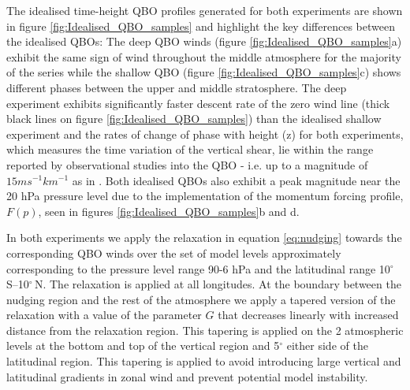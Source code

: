 The idealised time-height QBO profiles generated for both experiments are shown in figure \ref{fig:Idealised_QBO_samples} and highlight the key differences between the idealised QBOs: The deep QBO winds (figure \ref{fig:Idealised_QBO_samples}a) exhibit the same sign of wind throughout the middle atmosphere for the majority of the series while the shallow QBO (figure \ref{fig:Idealised_QBO_samples}c) shows different phases between the upper and middle stratosphere. The deep experiment exhibits significantly faster descent rate of the zero wind line (thick black lines on figure \ref{fig:Idealised_QBO_samples}) than the idealised shallow experiment and the rates of change of phase with height (z) for both experiments, which measures the time variation of the vertical shear, lie within the range reported by observational studies into the QBO - i.e. up to a magnitude of $15ms^{-1}km^{-1}$ as in \cite{kinnersleyDescent1996}. Both idealised QBOs also exhibit a peak magnitude near the 20 hPa pressure level due to the implementation of the momentum forcing profile, $F(p)$, seen in figures \ref{fig:Idealised_QBO_samples}b and d. 

In both experiments we apply the relaxation in equation \ref{eq:nudging} towards the corresponding QBO winds over the set of model levels approximately corresponding to the pressure level range 90-6 hPa and the latitudinal range 10$^{\circ}$\,S--10$^{\circ}$\,N. The relaxation is applied at all longitudes. At the boundary between the nudging region and the rest of the atmosphere we apply a tapered version of the relaxation with a value of the parameter $G$ that decreases linearly with increased distance from the relaxation region. This tapering is applied on the 2 atmospheric levels at the bottom and top of the vertical region and 5$^\circ$ either side of the latitudinal region. This tapering is applied to avoid introducing large vertical and latitudinal gradients in zonal wind and prevent potential model instability. 

